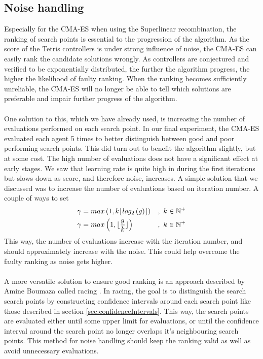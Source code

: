 \subsection{Noise handling}

Especially for the CMA-ES when using the Superlinear recombination, the ranking of search
points is essential to the progression of the algorithm. As the score of the Tetris controllers
is under strong influence of noise, the CMA-ES can easily rank the 
candidate solutions wrongly. As controllers are conjectured and verified to
be exponentially distributed, the further the algorithm progress, the higher the likelihood
of faulty ranking. When the ranking becomes sufficiently unreliable, the CMA-ES will
no longer be able to tell which solutions are preferable and impair further progress
of the algorithm.\\
\\
One solution to this, which we have already used, is increasing the number of evaluations
performed on each search point. In our final experiment, the CMA-ES evaluated each agent
5 times to better distinguish between good and poor performing search points. This did turn out
to benefit the algorithm slightly, but at some cost. The high number of evaluations does not have a
significant effect at early stages. We saw that learning rate is quite high in during the first 
iterations but slows down as score, and therefore noise, increases. A simple solution
that we discussed  was to increase the number of evaluations based on iteration number.
A couple of ways to set 
\begin{align}
\gamma &=  max\left( 1, k \lfloor log_{2} \left( g \right)  \rfloor \right) &,\ k \in \mathbb{N}^+\\
\gamma &=  max\left( 1, \lfloor \frac{g}{k} \rfloor \right) &,\ k \in \mathbb{N}^+
\end{align}
This way, the number of evaluations increase with the iteration number, and should approximately
increase with the noise. This could help overcome the faulty ranking as noise gets higher.\\
\\
A more versatile solution to ensure good ranking is an approach described by
Amine Boumaza called racing \citep{boumaza2011:b}. In racing, the goal is to 
distinguish the search search points by constructing confidence intervals around each
search point like those described in section \ref{sec:confidenceIntervals}.
This way, the search points are evaluated either until some upper limit for evaluations,
or until the confidence interval around the search point no longer overlaps it's
neighbouring search points. This method for noise handling should keep the ranking 
valid as well as avoid unnecessary evaluations.


